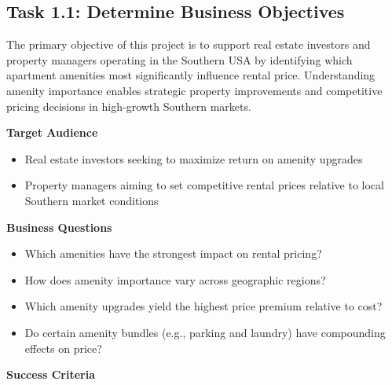 
\subsection*{Task 1.1: Determine Business Objectives}

The primary objective of this project is to support real estate investors and property managers operating in the Southern USA by identifying which apartment amenities most significantly influence rental price. Understanding amenity importance enables strategic property improvements and competitive pricing decisions in high-growth Southern markets.

\medskip\noindent
\textbf{Target Audience}
\vspace{-9pt}
\begin{itemize}[itemsep=-9pt]
    \item Real estate investors seeking to maximize return on amenity upgrades
    \item Property managers aiming to set competitive rental prices relative to local Southern market conditions
\end{itemize}

\vspace{-9pt}
\noindent
\textbf{Business Questions}
\vspace{-9pt}
\begin{itemize}[itemsep=-9pt]
    \item Which amenities have the strongest impact on rental pricing?
    \item How does amenity importance vary across geographic regions?%
    \item Which amenity upgrades yield the highest price premium relative to cost?
    \item Do certain amenity bundles (e.g., parking and laundry) have compounding effects on price?
\end{itemize}

\vspace{-9pt}
\noindent
\textbf{Success Criteria}

